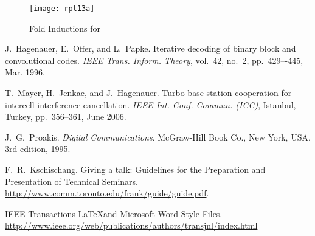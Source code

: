 \documentclass[journal, a4paper]{IEEEtran}
\begin{document}
  \begin{figure}[t]
    \centering
    \texttt{[image: rpl13a]}
    \caption{Fold Inductions for}
    \label{fig:mesh1}
  \end{figure}

\begin{thebibliography}{5}
    J.~Hagenauer, E.~Offer, and L.~Papke. Iterative decoding of binary block
    and convolutional codes. {\em IEEE Trans. Inform. Theory},
    vol.~42, no.~2, pp.~429–-445, Mar. 1996.

    T.~Mayer, H.~Jenkac, and J.~Hagenauer. Turbo base-station cooperation for intercell interference cancellation. {\em IEEE Int. Conf. Commun. (ICC)}, Istanbul, Turkey, pp.~356--361, June 2006.

    J.~G.~Proakis. {\em Digital Communications}. McGraw-Hill Book Co.,
    New York, USA, 3rd edition, 1995.

    F.~R.~Kschischang. Giving a talk: Guidelines for the Preparation and Presentation of Technical Seminars.
    \url{http://www.comm.toronto.edu/frank/guide/guide.pdf}.

    IEEE Transactions \LaTeX and Microsoft Word Style Files.
    \url{http://www.ieee.org/web/publications/authors/transjnl/index.html}


\end{thebibliography}

\end{document}

